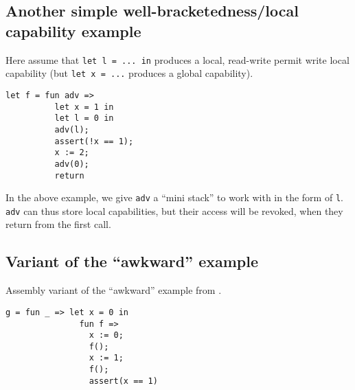 \documentclass[a4paper]{article}
\begin{document}
\subsection{Another simple well-bracketedness/local capability example}
Here assume that \texttt{let l = ... in} produces a local, read-write permit write local capability (but \texttt{let x = ...} produces a global capability). 
\begin{verbatim}
let f = fun adv =>
          let x = 1 in
          let l = 0 in
          adv(l);
          assert(!x == 1);
          x := 2;
          adv(0);
          return
\end{verbatim}
In the above example, we give \texttt{adv} a ``mini stack'' to work with in the form of \texttt{l}. \texttt{adv} can thus store local capabilities, but their access will be revoked, when they return from the first call.

\subsection{Variant of the ``awkward'' example}
Assembly variant of the ``awkward'' example from \citep[p.~11]{Dreyer:2010:IHS:1863543.1863566}. 
\begin{verbatim}
g = fun _ => let x = 0 in
               fun f =>
                 x := 0;
                 f();
                 x := 1;
                 f();
                 assert(x == 1)
\end{verbatim}
\end{document}
